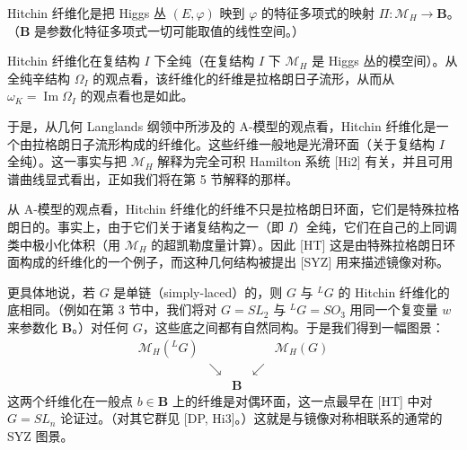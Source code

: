 Hitchin 纤维化是把 Higgs 丛 $(E,\varphi)$ 映到 $\varphi$ 的特征多项式的映射 $\Pi:\mathcal{M}_H\to\boldsymbol{B}$。（$\boldsymbol{B}$ 是参数化特征多项式一切可能取值的线性空间。）


Hitchin 纤维化在复结构 $I$ 下全纯（在复结构 $I$ 下 $\mathcal{M}_H$ 是 Higgs 丛的模空间）。从全纯辛结构 $\Omega_I$ 的观点看，该纤维化的纤维是拉格朗日子流形，从而从 $\omega_K=\operatorname{Im}\Omega_I$ 的观点看也是如此。

于是，从几何 Langlands 纲领中所涉及的 A-模型的观点看，Hitchin 纤维化是一个由拉格朗日子流形构成的纤维化。这些纤维一般地是光滑环面（关于复结构 $I$ 全纯）。这一事实与把 $\mathcal{M}_H$ 解释为完全可积 Hamilton 系统 [Hi2] 有关，并且可用谱曲线显式看出，正如我们将在第 5 节解释的那样。

从 A-模型的观点看，Hitchin 纤维化的纤维不只是拉格朗日环面，它们是特殊拉格朗日的。事实上，由于它们关于诸复结构之一（即 $I$）全纯，它们在自己的上同调类中极小化体积（用 $\mathcal{M}_H$ 的超凯勒度量计算）。因此 [HT] 这是由特殊拉格朗日环面构成的纤维化的一个例子，而这种几何结构被提出 [SYZ] 用来描述镜像对称。

更具体地说，若 $G$ 是单链（simply-laced）的，则 $G$ 与 ${}^{L}G$ 的 Hitchin 纤维化的底相同。（例如在第 3 节中，我们将对 $G=SL_2$ 与 ${}^{L}G=SO_3$ 用同一个复变量 $w$ 来参数化 $\boldsymbol{B}$。）对任何 $G$，这些底之间都有自然同构。于是我们得到一幅图景：
\begin{equation}\tag{2.2}
\begin{array}{ccccc}
\mathcal{M}_H({}^{L}G) & & & & \mathcal{M}_H(G)\\[2pt]
& \searrow & & \swarrow & \\[2pt]
& & \boldsymbol{B} & &
\end{array}
\end{equation}
这两个纤维化在一般点 $b\in\boldsymbol{B}$ 上的纤维是对偶环面，这一点最早在 [HT] 中对 $G=SL_n$ 论证过。（对其它群见 [DP, Hi3]。）这就是与镜像对称相联系的通常的 SYZ 图景。

